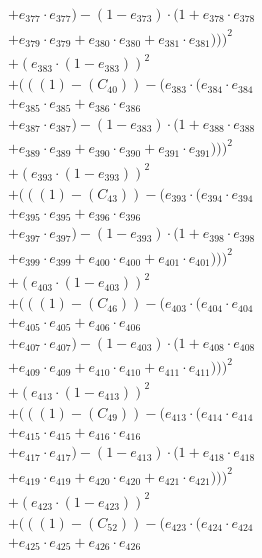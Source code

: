 \documentclass[10pt, a4paper]{article}
\begin{document}
\begin{align*}
& + e_{377} \cdot e_{377}) - (1 - e_{373}) \cdot (1 + e_{378} \cdot e_{378} \\
& + e_{379} \cdot e_{379} + e_{380} \cdot e_{380} + e_{381} \cdot e_{381})))^{2} \\
& + (e_{383} \cdot (1 - e_{383}))^{2} \\
& + (((1) - (C_{40})) - (e_{383} \cdot (e_{384} \cdot e_{384} \\
& + e_{385} \cdot e_{385} + e_{386} \cdot e_{386} \\
& + e_{387} \cdot e_{387}) - (1 - e_{383}) \cdot (1 + e_{388} \cdot e_{388} \\
& + e_{389} \cdot e_{389} + e_{390} \cdot e_{390} + e_{391} \cdot e_{391})))^{2} \\
& + (e_{393} \cdot (1 - e_{393}))^{2} \\
& + (((1) - (C_{43})) - (e_{393} \cdot (e_{394} \cdot e_{394} \\
& + e_{395} \cdot e_{395} + e_{396} \cdot e_{396} \\
& + e_{397} \cdot e_{397}) - (1 - e_{393}) \cdot (1 + e_{398} \cdot e_{398} \\
& + e_{399} \cdot e_{399} + e_{400} \cdot e_{400} + e_{401} \cdot e_{401})))^{2} \\
& + (e_{403} \cdot (1 - e_{403}))^{2} \\
& + (((1) - (C_{46})) - (e_{403} \cdot (e_{404} \cdot e_{404} \\
& + e_{405} \cdot e_{405} + e_{406} \cdot e_{406} \\
& + e_{407} \cdot e_{407}) - (1 - e_{403}) \cdot (1 + e_{408} \cdot e_{408} \\
& + e_{409} \cdot e_{409} + e_{410} \cdot e_{410} + e_{411} \cdot e_{411})))^{2} \\
& + (e_{413} \cdot (1 - e_{413}))^{2} \\
& + (((1) - (C_{49})) - (e_{413} \cdot (e_{414} \cdot e_{414} \\
& + e_{415} \cdot e_{415} + e_{416} \cdot e_{416} \\
& + e_{417} \cdot e_{417}) - (1 - e_{413}) \cdot (1 + e_{418} \cdot e_{418} \\
& + e_{419} \cdot e_{419} + e_{420} \cdot e_{420} + e_{421} \cdot e_{421})))^{2} \\
& + (e_{423} \cdot (1 - e_{423}))^{2} \\
& + (((1) - (C_{52})) - (e_{423} \cdot (e_{424} \cdot e_{424} \\
& + e_{425} \cdot e_{425} + e_{426} \cdot e_{426} \\

\end{align*}
\end{document}
